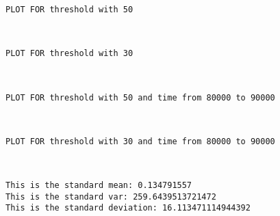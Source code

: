 \documentclass[11pt]{article}
\begin{document}
    \begin{Verbatim}[commandchars=\\\{\}]
PLOT FOR threshold with 50

    \end{Verbatim}

    \begin{center}
    \end{center}
    { \hspace*{\fill} \\}
    
    \begin{Verbatim}[commandchars=\\\{\}]
PLOT FOR threshold with 30

    \end{Verbatim}

    \begin{center}
    \end{center}
    { \hspace*{\fill} \\}
    
    \begin{Verbatim}[commandchars=\\\{\}]
PLOT FOR threshold with 50 and time from 80000 to 90000

    \end{Verbatim}

    \begin{center}
    \end{center}
    { \hspace*{\fill} \\}
    
    \begin{Verbatim}[commandchars=\\\{\}]
PLOT FOR threshold with 30 and time from 80000 to 90000

    \end{Verbatim}

    \begin{center}
    \end{center}
    { \hspace*{\fill} \\}
    
    \begin{Verbatim}[commandchars=\\\{\}]
This is the standard mean: 0.134791557
This is the standard var: 259.6439513721472
This is the standard deviation: 16.113471114944392

    \end{Verbatim}

    \begin{center}
    \end{center}
    { \hspace*{\fill} \\}
    

    
    
    
    
\end{document}

